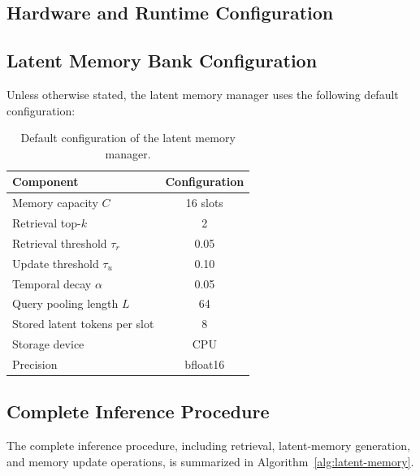 \documentclass[letterpaper]{article}
\begin{document}
\subsection{Hardware and Runtime Configuration}
\label{sec:supp-runtime}



\subsection{Latent Memory Bank Configuration}
\label{sec:supp-bank-config}

Unless otherwise stated, the latent memory manager uses the following
default configuration:

\begin{table}[h]
\centering
\begin{tabular}{lc}
\toprule
Component & Configuration\\
\midrule
Memory capacity $C$ & 16 slots\\
Retrieval top-$k$ & 2\\
Retrieval threshold $\tau_r$ & 0.05\\
Update threshold $\tau_u$ & 0.10\\
Temporal decay $\alpha$ & 0.05\\
Query pooling length $L$ & 64\\
Stored latent tokens per slot & 8\\
Storage device & CPU\\
Precision & bfloat16\\
\bottomrule
\end{tabular}
\caption{Default configuration of the latent memory manager.}
\label{tab:supp-bank-config}
\end{table}



\subsection{Complete Inference Procedure}
\label{sec:supp-algorithm}

The complete inference procedure, including retrieval, latent-memory
generation, and memory update operations, is summarized in
Algorithm~\ref{alg:latent-memory}.
\end{document}
